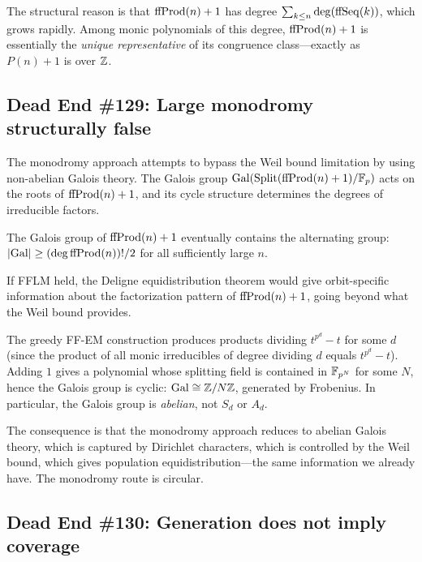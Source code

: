 The structural reason is that $\mathrm{ffProd}(n) + 1$ has degree
$\sum_{k \leq n} \deg(\mathrm{ffSeq}(k))$, which grows rapidly. Among monic
polynomials of this degree, $\mathrm{ffProd}(n) + 1$ is essentially the
\emph{unique representative} of its congruence class---exactly as
$P(n) + 1$ is over $\mathbb{Z}$.

\subsection{Dead End \#129: Large monodromy structurally false}

The monodromy approach attempts to bypass the Weil bound limitation by
using non-abelian Galois theory. The Galois group
$\mathrm{Gal}(\mathrm{Split}(\mathrm{ffProd}(n)+1)/\mathbb{F}_p)$ acts on the roots of
$\mathrm{ffProd}(n)+1$, and its cycle structure determines the degrees of
irreducible factors.

\begin{definition}
The Galois group of $\mathrm{ffProd}(n)+1$ eventually contains the alternating
group: $|\mathrm{Gal}| \geq (\deg \mathrm{ffProd}(n))!/2$ for all sufficiently
large $n$.
\end{definition}

If FFLM held, the Deligne equidistribution theorem would give orbit-specific
information about the factorization pattern of $\mathrm{ffProd}(n) + 1$, going
beyond what the Weil bound provides.

\begin{theorem}\label{thm:de129}
The greedy FF-EM construction produces products dividing $t^{p^d} - t$
for some $d$ (since the product of all monic irreducibles of degree
dividing $d$ equals $t^{p^d} - t$). Adding $1$ gives a polynomial whose
splitting field is contained in $\mathbb{F}_{p^{N}}$ for some $N$, hence the Galois
group is cyclic: $\mathrm{Gal} \cong \mathbb{Z}/N\mathbb{Z}$, generated by Frobenius.
In particular, the Galois group is \emph{abelian}, not $S_d$ or $A_d$.
\end{theorem}

The consequence is that the monodromy approach reduces to abelian Galois
theory, which is captured by Dirichlet characters, which is controlled by
the Weil bound, which gives population equidistribution---the same
information we already have. The monodromy route is circular.

\subsection{Dead End \#130: Generation does not imply coverage}

